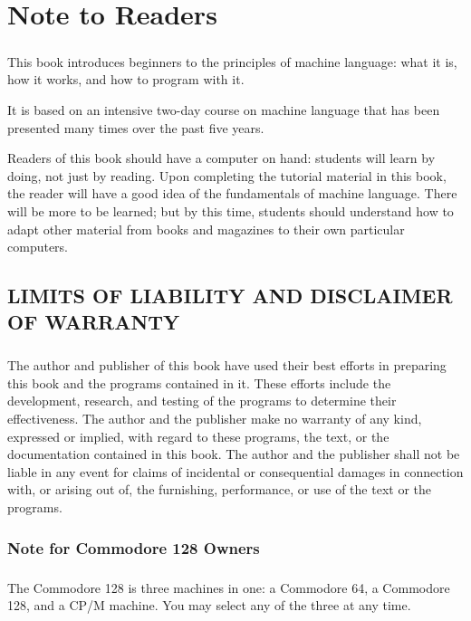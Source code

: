 \documentclass[11pt,a4paper,titlepage]{memoir}
\begin{document}
\chapter{Note to Readers}
\paragraph{}
This book introduces beginners to the principles of machine language: what it is, how it works, and how to program with it.

It is based on an intensive two-day course on machine language that has been presented many times over the past five years.

Readers of this book should have a computer on hand: students will learn by doing, not just by reading. Upon completing the tutorial material in this book, the reader will have a good idea of the fundamentals of machine language. There will be more to be learned; but by this time, students should understand how to adapt other material from books and magazines to their own particular computers.\\
\section{LIMITS OF LIABILITY AND DISCLAIMER OF WARRANTY}
\paragraph{}
The author and publisher of this book have used their best efforts in preparing this book and the programs contained in it. These efforts include the development, research, and testing of the programs to determine their effectiveness. The author and the publisher make no warranty of any kind, expressed or implied, with regard to these programs, the text, or the documentation contained in this book. The author and the publisher shall not be liable in any event for claims of incidental or consequential damages in connection with, or arising out of, the furnishing, performance, or use of the text or the programs.
\subsection{Note for Commodore 128 Owners}
\paragraph{}
The Commodore 128 is three machines in one: a Commodore 64, a Commodore 128, and a CP/M machine. You may select any of the three at any time.
\end{document}
